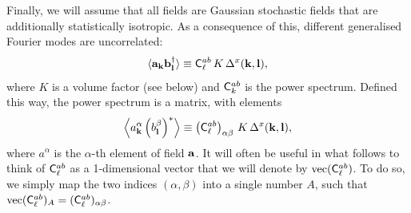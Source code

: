 \documentclass[a4paper,11pt]{article}
\begin{document}
      Finally, we will assume that all fields are Gaussian stochastic fields that are additionally statistically isotropic. As a consequence of this, different generalised Fourier modes are uncorrelated:
      \begin{equation}\label{eq:iso}
        \langle {\bf a}_{\bf k}{\bf b}^\dag_{\bf l}\rangle\equiv {\sf C}^{ab}_\ell\,K\,\Delta^x({\bf k},{\bf l}),
      \end{equation}
      where $K$ is a volume factor (see below) and ${\sf C}^{ab}_k$ is the power spectrum. Defined this way, the power spectrum is a matrix, with elements
      \begin{equation}
        \left\langle a^\alpha_{\bf k}\left(b^\beta_{\bf l}\right)^*\right\rangle\equiv \left({\sf C}^{ab}_\ell\right)_{\alpha\beta}\,K\,\Delta^x({\bf k},{\bf l}),
      \end{equation}
      where $a^\alpha$ is the $\alpha$-th element of field ${\bf a}$. It will often be useful in what follows to think of ${\sf C}^{ab}_\ell$ as a 1-dimensional vector that we will denote by ${\rm vec}({\sf C}^{ab}_\ell)$. To do so, we simply map the two indices $(\alpha,\beta)$ into a single number $A$, such that ${\rm vec}({\sf C}^{ab}_\ell)_A = ({\sf C}^{ab}_\ell)_{\alpha\beta}$.
    
\end{document}
